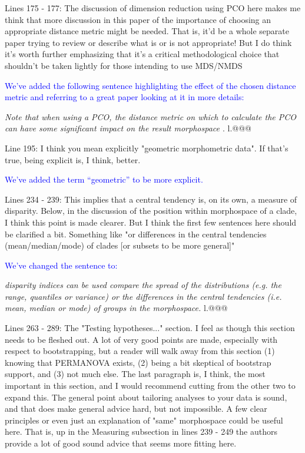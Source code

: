 \documentclass[12pt,letterpaper]{article}
\begin{document}
\noindent Lines 175 - 177: The discussion of dimension reduction using PCO here makes me think that more discussion in this paper of the importance of choosing an appropriate distance metric might be needed. That is, it'd be a whole separate paper trying to review or describe what is or is not appropriate! But I do think it's worth further emphasizing that it's a critical methodological choice that shouldn't be taken lightly for those intending to use MDS/NMDS

\textcolor{blue}{We've added the following sentence highlighting the effect of the chosen distance metric and referring to a great paper looking at it in more details:}

\textit{Note that when using a PCO, the distance metric on which to calculate the PCO can have some significant impact on the result morphospace \citep{lehmann2019}}. l.@@@


\noindent Line 195: I think you mean explicitly "geometric morphometric data". If that's true, being explicit is, I think, better.

\textcolor{blue}{We've added the term ``geometric'' to be more explicit.}

\noindent Lines 234 - 239: This implies that a central tendency is, on its own, a measure of disparity. Below, in the discussion of the position within morphospace of a clade, I think this point is made clearer. But I think the first few sentences here should be clarified a bit. Something like "or differences in the central tendencies (mean/median/mode) of clades [or subsets to be more general]"

\textcolor{blue}{We've changed the sentence to:}

\textit{disparity indices can be used compare the spread of the distributions (e.g. the range, quantiles or variance) or the differences in the central tendencies (i.e. mean, median or mode) of groups in the morphospace.} l.@@@

\noindent Lines 263 - 289: The "Testing hypotheses..." section. I feel as though this section needs to be fleshed out. A lot of very good points are made, especially with respect to bootstrapping, but a reader will walk away from this section (1) knowing that PERMANOVA exists, (2) being a bit skeptical of bootstrap support, and (3) not much else. The last paragraph is, I think, the most important in this section, and I would recommend cutting from the other two to expand this.
The general point about tailoring analyses to your data is sound, and that does make general advice hard, but not impossible. A few clear principles or even just an explanation of "same" morphospace could be useful here. That is, up in the Measuring subsection in lines 239 - 249 the authors provide a lot of good sound advice that seems more fitting here. 
\end{document}
